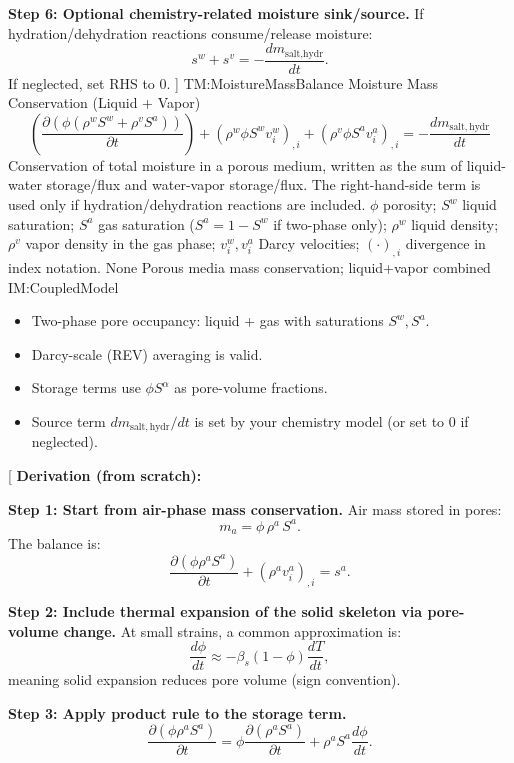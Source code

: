 \documentclass[12pt]{article}
\newcommand{\deftheory}[9][Not Applicable]
{
\newpage
\noindent \rule{\textwidth}{0.5mm}

\paragraph{RefName: } \textbf{#2} \phantomsection
\label{#2}

\paragraph{Label:} #3

\noindent \rule{\textwidth}{0.5mm}

\paragraph{Equation:}
#4

\paragraph{Description:}
#5

\paragraph{Notes:}
#6

\paragraph{Source:}
#7

\paragraph{Ref.\ By:}
#8

\paragraph{Preconditions for \hyperref[#2]{#2}:}
\label{#2_precond}
#9

\paragraph{Derivation for \hyperref[#2]{#2}:}
\label{#2_deriv}
#1

\noindent \rule{\textwidth}{0.5mm}
}
\begin{document}
\textbf{Step 6: Optional chemistry-related moisture sink/source.}
If hydration/dehydration reactions consume/release moisture:
\[
s^w+s^v = -\frac{dm_{\text{salt,hydr}}}{dt}.
\]
If neglected, set RHS to $0$.
]
{TM:MoistureMassBalance}
{Moisture Mass Conservation (Liquid + Vapor)}
{
\[
\left(\frac{\partial\left(\phi\left(\rho^{w}S^{w}+\rho^{v}S^{a}\right)\right)}{\partial t}\right)
+\left(\rho^{w}\phi S^{w}v^{w}_{i}\right)_{,i}
+\left(\rho^{v}\phi S^{a}v^{a}_{i}\right)_{,i}
= -\frac{d m_{\mathrm{salt,hydr}}}{dt}
\]
}
{
Conservation of total moisture in a porous medium, written as the sum of liquid-water storage/flux and water-vapor storage/flux. The right-hand-side term is used only if hydration/dehydration reactions are included.
}
{
$\phi$ porosity; $S^{w}$ liquid saturation; $S^{a}$ gas saturation ($S^{a}=1-S^{w}$ if two-phase only);
$\rho^{w}$ liquid density; $\rho^{v}$ vapor density in the gas phase; $v^{w}_{i},v^{a}_{i}$ Darcy velocities;
$(\cdot)_{,i}$ divergence in index notation.
}
{None}
{Porous media mass conservation; liquid+vapor combined}
{IM:CoupledModel}
{
\begin{itemize}
\item Two-phase pore occupancy: liquid + gas with saturations $S^w, S^a$.
\item Darcy-scale (REV) averaging is valid.
\item Storage terms use $\phi S^\alpha$ as pore-volume fractions.
\item Source term $dm_{\mathrm{salt,hydr}}/dt$ is set by your chemistry model (or set to 0 if neglected).
\end{itemize}
}
{}

\noindent
{}[
\textbf{Derivation (from scratch):}

\textbf{Step 1: Start from air-phase mass conservation.}
Air mass stored in pores:
\[
m_a = \phi\,\rho^a\,S^a.
\]
The balance is:
\[
\frac{\partial(\phi\rho^a S^a)}{\partial t} + (\rho^a v_i^a)_{,i} = s^a.
\]

\textbf{Step 2: Include thermal expansion of the solid skeleton via pore-volume change.}
At small strains, a common approximation is:
\[
\frac{d\phi}{dt} \approx -\beta_s(1-\phi)\frac{dT}{dt},
\]
meaning solid expansion reduces pore volume (sign convention).

\textbf{Step 3: Apply product rule to the storage term.}
\[
\frac{\partial(\phi\rho^a S^a)}{\partial t}
= \phi\frac{\partial(\rho^a S^a)}{\partial t} + \rho^a S^a\frac{d\phi}{dt}.
\]
\end{document}
